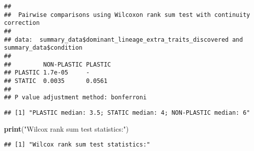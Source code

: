 \documentclass[]{book}
\newenvironment{Shaded}{\begin{snugshade}}{\end{snugshade}}
\newcommand{\DataTypeTok}[1]{\textcolor[rgb]{0.13,0.29,0.53}{#1}}
\newcommand{\KeywordTok}[1]{\textcolor[rgb]{0.13,0.29,0.53}{\textbf{#1}}}
\newcommand{\NormalTok}[1]{#1}
\newcommand{\OperatorTok}[1]{\textcolor[rgb]{0.81,0.36,0.00}{\textbf{#1}}}
\newcommand{\StringTok}[1]{\textcolor[rgb]{0.31,0.60,0.02}{#1}}
\begin{document}
\begin{verbatim}
## 
##  Pairwise comparisons using Wilcoxon rank sum test with continuity correction 
## 
## data:  summary_data$dominant_lineage_extra_traits_discovered and summary_data$condition 
## 
##         NON-PLASTIC PLASTIC
## PLASTIC 1.7e-05     -      
## STATIC  0.0035      0.0561 
## 
## P value adjustment method: bonferroni
\end{verbatim}

\begin{Shaded}
\end{Shaded}

\begin{verbatim}
## [1] "PLASTIC median: 3.5; STATIC median: 4; NON-PLASTIC median: 6"
\end{verbatim}

\begin{Shaded}
\begin{Highlighting}[]
\KeywordTok{print}\NormalTok{(}\StringTok{"Wilcox rank sum test statistics:"}\NormalTok{)}
\end{Highlighting}
\end{Shaded}

\begin{verbatim}
## [1] "Wilcox rank sum test statistics:"
\end{verbatim}
\end{document}
